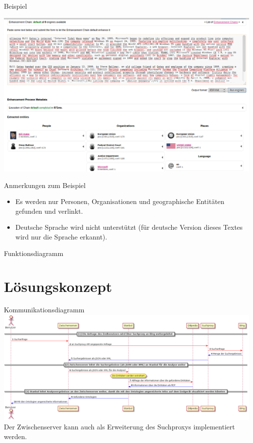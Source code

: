 \documentclass{beamer}
\begin{document}
  \begin{frame}[c]{Beispiel}
  \begin{center}
  \includegraphics[width=0.7\linewidth]{pics/stanbol-enchancer.png}
  \end{center}
  \end{frame}
  
  \begin{frame}{Anmerkungen zum Beispiel}
  \begin{itemize}
  \item Es werden nur Personen, Organisationen und geographische Entitäten gefunden und verlinkt.
  \item Deutsche Sprache wird nicht unterstützt (für deutsche Version dieses Textes wird nur die Sprache erkannt).
  \end{itemize}
  \end{frame}
  
  \begin{frame}[c]{Funktionsdiagramm}
  
  \end{frame}
  
  \section{Lösungskonzept}
  \begin{frame}[c]{Kommunikationsdiagramm}
  \includegraphics[width=0.94\linewidth]{diagramms/kommunikation.png}\\
  Der Zwischenserver kann auch als Erweiterung des Suchproxys implementiert werden.
  \end{frame}
  
\end{document}
